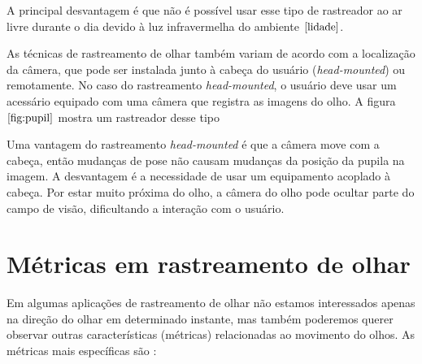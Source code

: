 A principal desvantagem é que não é possível usar esse tipo de rastreador ao ar livre durante o dia devido à luz infravermelha do ambiente $\cite{lidade}$.

As técnicas de rastreamento de olhar também variam de acordo com a localização da câmera, que pode ser instalada junto à cabeça do usuário (\textit{head-mounted}) ou remotamente. No caso do rastreamento \textit{head-mounted}, o usuário deve usar um acessário equipado com uma câmera que registra as imagens do olho. A figura $\ref{fig:pupil}$ mostra um rastreador desse tipo


Uma vantagem do rastreamento \textit{head-mounted} é que a câmera move com a cabeça, então mudanças de pose não causam mudanças da posição da pupila na imagem. A desvantagem é a necessidade de usar um equipamento acoplado à cabeça. Por estar muito próxima do olho, a câmera do olho pode ocultar parte do campo de visão, dificultando a interação com o usuário.

\section{Métricas em rastreamento de olhar}

Em algumas aplicações de rastreamento de olhar não estamos interessados apenas na direção do olhar em determinado instante, mas também poderemos querer observar outras características (métricas) relacionadas ao movimento do olhos. As métricas mais específicas são \cite{lupung}:

